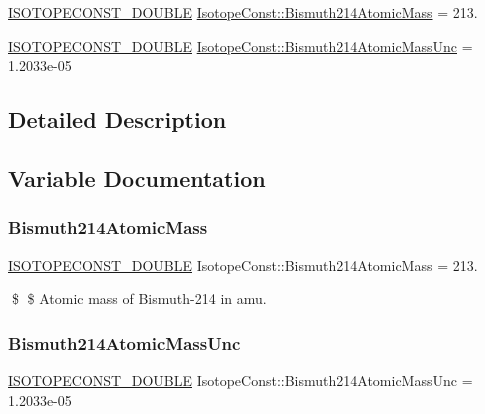 \begin{DoxyCompactItemize}
\item 
\mbox{\hyperlink{group___isotope_const-_macros_ga8f45a7272ce02c0b4c65c44636ed719a}{I\+S\+O\+T\+O\+P\+E\+C\+O\+N\+S\+T\+\_\+\+D\+O\+U\+B\+LE}} \mbox{\hyperlink{group___isotope_const-_bismuth-_bi214_ga676f950953bdfcc92d37d6af2c26e822}{Isotope\+Const\+::\+Bismuth214\+Atomic\+Mass}} = 213.
\item 
\mbox{\hyperlink{group___isotope_const-_macros_ga8f45a7272ce02c0b4c65c44636ed719a}{I\+S\+O\+T\+O\+P\+E\+C\+O\+N\+S\+T\+\_\+\+D\+O\+U\+B\+LE}} \mbox{\hyperlink{group___isotope_const-_bismuth-_bi214_ga1c6e5249211d19de441bc9635843d1bb}{Isotope\+Const\+::\+Bismuth214\+Atomic\+Mass\+Unc}} = 1.\+2033e-\/05
\end{DoxyCompactItemize}


\subsection{Detailed Description}


\subsection{Variable Documentation}
\mbox{\label{group___isotope_const-_bismuth-_bi214_ga676f950953bdfcc92d37d6af2c26e822}} 
\subsubsection{\texorpdfstring{Bismuth214\+Atomic\+Mass}{Bismuth214AtomicMass}}
{\footnotesize\ttfamily \mbox{\hyperlink{group___isotope_const-_macros_ga8f45a7272ce02c0b4c65c44636ed719a}{I\+S\+O\+T\+O\+P\+E\+C\+O\+N\+S\+T\+\_\+\+D\+O\+U\+B\+LE}} Isotope\+Const\+::\+Bismuth214\+Atomic\+Mass = 213.}

\$ \$ Atomic mass of Bismuth-\/214 in amu. \mbox{\label{group___isotope_const-_bismuth-_bi214_ga1c6e5249211d19de441bc9635843d1bb}} 
\subsubsection{\texorpdfstring{Bismuth214\+Atomic\+Mass\+Unc}{Bismuth214AtomicMassUnc}}
{\footnotesize\ttfamily \mbox{\hyperlink{group___isotope_const-_macros_ga8f45a7272ce02c0b4c65c44636ed719a}{I\+S\+O\+T\+O\+P\+E\+C\+O\+N\+S\+T\+\_\+\+D\+O\+U\+B\+LE}} Isotope\+Const\+::\+Bismuth214\+Atomic\+Mass\+Unc = 1.\+2033e-\/05}

